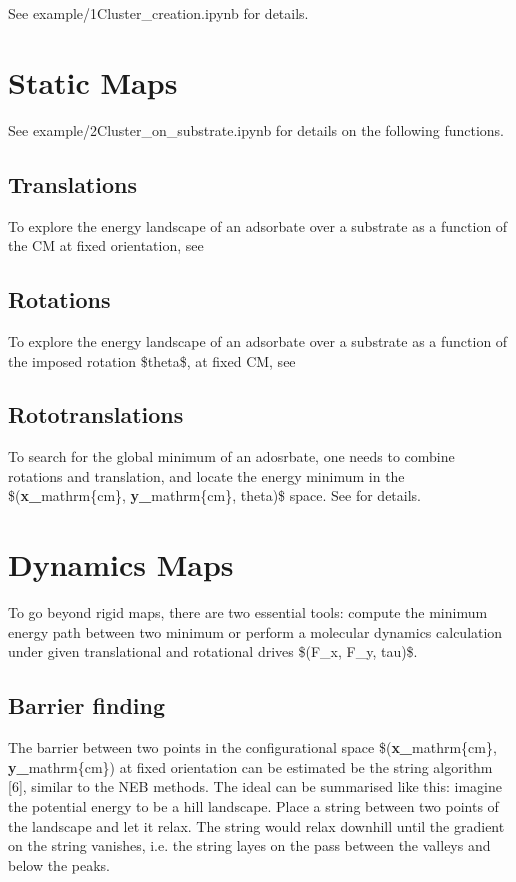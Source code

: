 \documentclass[letterpaper,10pt,english]{sphinxmanual}
\begin{document}
\sphinxAtStartPar
See example/1\sphinxhyphen{}Cluster\_creation.ipynb for details.


\chapter{Static Maps}
\label{\detokenize{index:static-maps}}
\sphinxAtStartPar
See example/2\sphinxhyphen{}Cluster\_on\_substrate.ipynb for details on the following functions.


\section{Translations}
\label{\detokenize{index:translations}}
\sphinxAtStartPar
To explore the energy landscape of an adsorbate over a substrate as a function of the CM at fixed orientation, see 


\section{Rotations}
\label{\detokenize{index:rotations}}
\sphinxAtStartPar
To explore the energy landscape of an adsorbate over a substrate as a function of the imposed rotation \$theta\$, at fixed CM, see 


\section{Roto\sphinxhyphen{}translations}
\label{\detokenize{index:roto-translations}}
\sphinxAtStartPar
To search for the global minimum of an adosrbate, one needs to combine rotations and translation, and locate the energy minimum in the \$({\color{red}\bfseries{}x\_}mathrm\{cm\}, {\color{red}\bfseries{}y\_}mathrm\{cm\}, theta)\$ space. See  for details.


\chapter{Dynamics Maps}
\label{\detokenize{index:dynamics-maps}}
\sphinxAtStartPar
To go beyond rigid maps, there are two essential tools: compute the minimum energy path between two minimum or perform a molecular dynamics calculation under given translational and rotational drives \$(F\_x, F\_y, tau)\$.


\section{Barrier finding}
\label{\detokenize{index:barrier-finding}}
\sphinxAtStartPar
The barrier between two points in the configurational space \$({\color{red}\bfseries{}x\_}mathrm\{cm\}, {\color{red}\bfseries{}y\_}mathrm\{cm\}) at fixed orientation can be estimated be the string algorithm {[}6{]}, similar to the NEB methods.
The ideal can be summarised like this: imagine the potential energy to be a hill landscape. Place a string between two points of the landscape and let it relax. The string would relax downhill until the gradient on the string vanishes, i.e. the string layes on the pass between the valleys and below the peaks.
\end{document}
